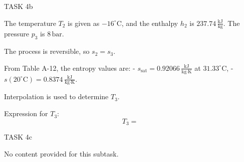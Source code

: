 TASK 4b

The temperature \( T_2 \) is given as \( -16^\circ\text{C} \), and the enthalpy \( h_2 \) is \( 237.74 \, \frac{\text{kJ}}{\text{kg}} \). The pressure \( p_3 \) is \( 8 \, \text{bar} \).

The process is reversible, so \( s_2 = s_3 \).

From Table A-12, the entropy values are:
- \( s_{\text{sat}} = 0.92066 \, \frac{\text{kJ}}{\text{kg·K}} \) at \( 31.33^\circ\text{C} \),
- \( s(20^\circ\text{C}) = 0.8374 \, \frac{\text{kJ}}{\text{kg·K}} \).

Interpolation is used to determine \( T_3 \).

Expression for \( T_3 \):  
\[
T_3 =
\]

TASK 4c

No content provided for this subtask.